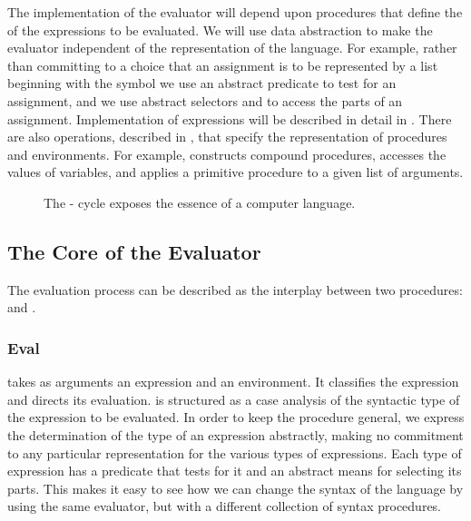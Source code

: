 The implementation of the evaluator will depend upon procedures that define the  of the expressions to be evaluated.
We will use data abstraction to make the evaluator independent of the representation of the language.
For example, rather than committing to a choice that an assignment is to be represented by a list beginning with the symbol  we use an abstract predicate  to test for an assignment, and we use abstract selectors  and  to access the parts of an assignment.
Implementation of expressions will be described in detail in .
There are also operations, described in , that specify the representation of procedures and environments.
For example,  constructs compound procedures,  accesses the values of variables, and  applies a primitive procedure to a given list of arguments.

\begin{figure}[tb]
	\centering
	
	\caption{
		The - cycle exposes the essence of a computer language.
	}
	\label{Figure 4.1}
\end{figure}



\subsection{The Core of the Evaluator}
\label{Section 4.1.1}

The evaluation process can be described as the interplay between two procedures:
 and .



\subsubsection*{Eval}

 takes as arguments an expression and an environment.
It classifies the expression and directs its evaluation.
 is structured as a case analysis of the syntactic type of the expression to be evaluated.
In order to keep the procedure general, we express the determination of the type of an expression abstractly, making no commitment to any particular representation for the various types of expressions.
Each type of expression has a predicate that tests for it and an abstract means for selecting its parts.
This  makes it easy to see how we can change the syntax of the language by using the same evaluator, but with a different collection of syntax procedures.

